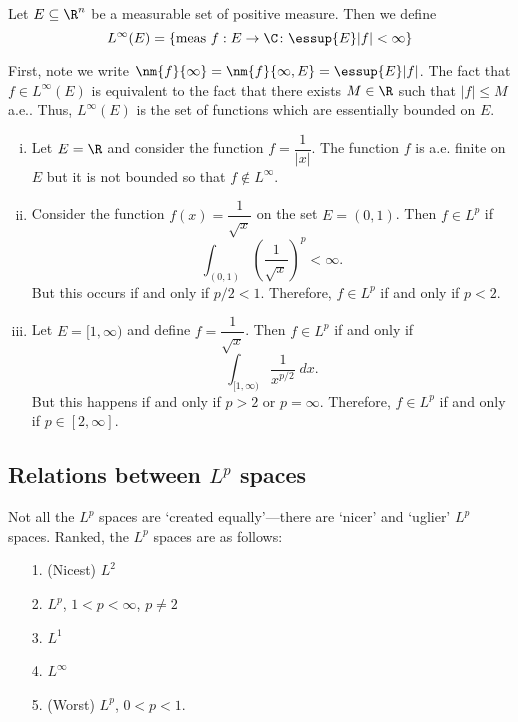 \begin{dfn}[$L^\infty(E)$]
Let $E \subseteq \R^n$ be a measurable set of positive measure. Then we define
	\[
	L^\infty(E)= \{ \text{meas } f: E \to \C \colon \essup{E} |f| < \infty \}
	\]
\end{dfn}

First, note we write $\nm{f}{\infty}= \nm{f}{\infty,E}= \essup{E} |f|$. The fact that $f \in L^\infty(E)$ is equivalent to the fact that there exists $M \in \R$ such that $|f| \leq M$ a.e.. Thus, $L^\infty(E)$ is the set of functions which are essentially bounded on $E$. 


\begin{ex} \hfill
\begin{enumerate}[(i)]
\item Let $E=\R$ and consider the function $f= \dfrac{1}{|x|}$. The function $f$ is a.e. finite on $E$ but it is not bounded so that $f \notin L^\infty$. 

\item Consider the function $f(x)= \dfrac{1}{\sqrt{x}}$ on the set $E=(0,1)$. Then $f \in L^p$ if
	\[
	\int_{(0,1)} \left( \dfrac{1}{\sqrt{x}} \right)^p < \infty.
	\]
But this occurs if and only if $p/2<1$. Therefore, $f \in L^p$ if and only if $p<2$. 

\item Let $E= [1,\infty)$ and define $f= \dfrac{1}{\sqrt{x}}$. Then $f \in L^p$ if and only if
	\[
	\int_{[1,\infty)} \dfrac{1}{x^{p/2}} \; dx.
	\]
But this happens if and only if $p>2$ or $p= \infty$. Therefore, $f \in L^p$ if and only if $p \in [2,\infty]$. 
\end{enumerate}
\end{ex} \xqed



\subsection{Relations between $L^p$ spaces}

Not all the $L^p$ spaces are `created equally'---there are `nicer' and `uglier' $L^p$ spaces. Ranked, the $L^p$ spaces are as follows:
	\begin{enumerate}
	\item[1.] (Nicest) $L^2$
	\item[2.] $L^p$, $1<p<\infty$, $p \neq 2$
	\item[3.] $L^1$
	\item[4.] $L^\infty$
	\item[5.] (Worst) $L^p$, $0<p<1$. 
	\end{enumerate}


